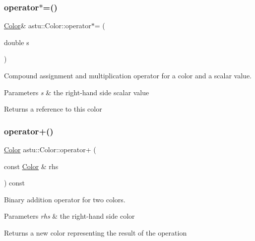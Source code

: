 \subsubsection{\texorpdfstring{operator$\ast$=()}{operator*=()}}
{\footnotesize\ttfamily \hyperlink{classastu_1_1Color}{Color}\& astu\+::\+Color\+::operator$\ast$= (\begin{DoxyParamCaption}\item[{double}]{s }\end{DoxyParamCaption})}

Compound assignment and multiplication operator for a color and a scalar value.


\begin{DoxyParams}{Parameters}
{\em s} & the right-\/hand side scalar value \\
\hline
\end{DoxyParams}
\begin{DoxyReturn}{Returns}
a reference to this color 
\end{DoxyReturn}
\mbox{\label{classastu_1_1Color_aca7e48a64d881e1287805f52b81a7066}} 
\subsubsection{\texorpdfstring{operator+()}{operator+()}}
{\footnotesize\ttfamily \hyperlink{classastu_1_1Color}{Color} astu\+::\+Color\+::operator+ (\begin{DoxyParamCaption}\item[{const \hyperlink{classastu_1_1Color}{Color} \&}]{rhs }\end{DoxyParamCaption}) const}

Binary addition operator for two colors.


\begin{DoxyParams}{Parameters}
{\em rhs} & the right-\/hand side color \\
\hline
\end{DoxyParams}
\begin{DoxyReturn}{Returns}
a new color representing the result of the operation 
\end{DoxyReturn}
\mbox{\label{classastu_1_1Color_af4c777a4e4cf3a7770d8499c4fa10c3e}} 
